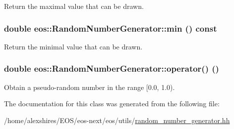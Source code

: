 Return the maximal value that can be drawn. \hypertarget{classeos_1_1RandomNumberGenerator_a2268a048896484b9d12d86fcfd7a6dbb}{
\subsubsection[{min}]{\setlength{\rightskip}{0pt plus 5cm}double eos::RandomNumberGenerator::min () const}}
\label{classeos_1_1RandomNumberGenerator_a2268a048896484b9d12d86fcfd7a6dbb}


Return the minimal value that can be drawn. \hypertarget{classeos_1_1RandomNumberGenerator_ac81a62bb3e4534fcfb0d15195ee653b0}{
\subsubsection[{operator()}]{\setlength{\rightskip}{0pt plus 5cm}double eos::RandomNumberGenerator::operator() ()}}
\label{classeos_1_1RandomNumberGenerator_ac81a62bb3e4534fcfb0d15195ee653b0}


Obtain a pseudo-\/random number in the range \mbox{[}0.0, 1.0). 

The documentation for this class was generated from the following file:\begin{DoxyCompactItemize}
\item 
/home/alexshires/EOS/eos-\/next/eos/utils/\hyperlink{random__number__generator_8hh}{random\_\-number\_\-generator.hh}\end{DoxyCompactItemize}
